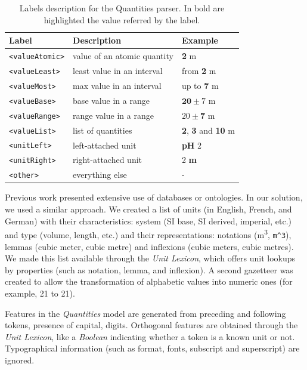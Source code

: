 \begin{table}[htbp]
\centering
  \caption{Labels description for the Quantities parser. In bold are highlighted the value referred by the label.}
  \label{tab:quantities-model-labels}
  \begin{tabular}{lll}
    \toprule
    Label & Description & Example\\
    \midrule
    \texttt{<valueAtomic>} & value of an atomic quantity & \textbf{2} m \\
    \texttt{<valueLeast>} & least value in an interval & from \textbf{2} m \\
    \texttt{<valueMost>} & max value in an interval & up to \textbf{7} m \\
    \texttt{<valueBase>} & base value in a range & $\textbf{20}\pm7$ m \\
    \texttt{<valueRange>} & range value in a range & $20 \pm \textbf{7}$ m \\
    \texttt{<valueList>} & list of quantities & \textbf{2}, \textbf{3} and \textbf{10} m \\
    \texttt{<unitLeft>} & left-attached unit & \textbf{pH} 2 \\
    \texttt{<unitRight>} & right-attached unit & 2 \textbf{m} \\
    \texttt{<other>} & everything else & - \\
  \bottomrule
\end{tabular}
\end{table}

Previous work presented extensive use of databases or ontologies. In our solution, we used a similar approach. We created a list of units (in English, French, and German) with their characteristics: system (SI base, SI derived, imperial, etc.) and type (volume, length, etc.) and their representations: notations (m\textsuperscript{3}, \texttt{m\^{}3}), lemmas (cubic meter, cubic metre) and inflexions (cubic meters, cubic metres). We made this list available through the \textit{Unit Lexicon}, which offers unit lookups by properties (such as notation, lemma, and inflexion). A second gazetteer was created to allow the transformation of alphabetic values into numeric ones (for example, 21 to 21).

Features in the \textit{Quantities} model are generated from preceding and following tokens, presence of capital, digits. Orthogonal features are obtained through the \textit{Unit Lexicon}, like a \textit{Boolean} indicating whether a token is a known unit or not. Typographical information (such as format, fonts, subscript and superscript) are ignored. 

